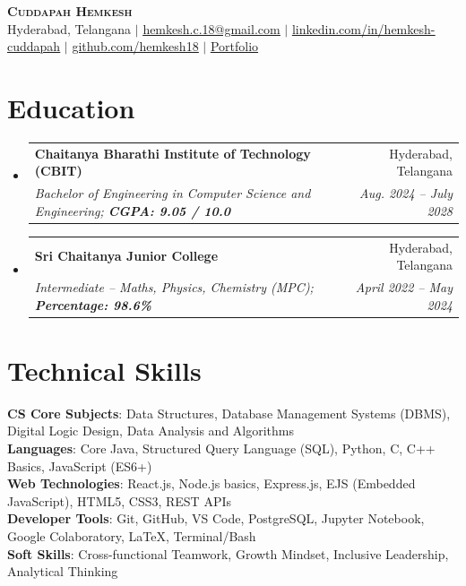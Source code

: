 \documentclass[letterpaper,10.8pt]{article}
\makeatletter
\newcommand{\resumeSubheading}[4]{
  \vspace{-2pt}\item
    \begin{tabular*}{0.97\textwidth}[t]{l@{\extracolsep{\fill}}r}
      \textbf{#1} & #2 \\
      \textit{\small#3} & \textit{\small #4} \\
    \end{tabular*}\vspace{-6pt}
}
\newcommand{\resumeSubHeadingListStart}{\begin{itemize}[leftmargin=0.15in, label={}]}
\newcommand{\resumeSubHeadingListEnd}{\end{itemize}}
\makeatother
\begin{document}
\begin{center}
    \textbf{\Huge \scshape Cuddapah Hemkesh} \\ \vspace{4pt}
    \small Hyderabad, Telangana $|$ 
    \href{mailto:hemkesh.c.18@gmail.com}{\underline{hemkesh.c.18@gmail.com}} $|$ 
    \href{https://linkedin.com/in/hemkesh-cuddapah}{\underline{linkedin.com/in/hemkesh-cuddapah}} $|$ 
    \href{https://github.com/hemkesh18}{\underline{github.com/hemkesh18}} $|$ 
    \href{https://hemkesh-portfolio.vercel.app}{\underline{Portfolio}}
\end{center}

\section{Education}
  \resumeSubHeadingListStart
    \resumeSubheading
      {Chaitanya Bharathi Institute of Technology (CBIT)}{Hyderabad, Telangana}
      {Bachelor of Engineering in Computer Science and Engineering; \textbf{CGPA: 9.05 / 10.0}}{Aug. 2024 -- July 2028}
    \resumeSubheading
      {Sri Chaitanya Junior College}{Hyderabad, Telangana}
      {Intermediate -- Maths, Physics, Chemistry (MPC); \textbf{Percentage: 98.6\%}}{April 2022 -- May 2024}
  \resumeSubHeadingListEnd

\section{Technical Skills}
 \begin{itemize}[leftmargin=0.15in, label={}]
    \small{\item{
     \textbf{CS Core Subjects}{: Data Structures, Database Management Systems (DBMS), Digital Logic Design, Data Analysis and Algorithms} \\
     \textbf{Languages}{: Core Java, Structured Query Language (SQL), Python, C, C++ Basics, JavaScript (ES6+)} \\
     \textbf{Web Technologies}{: React.js, Node.js basics, Express.js, EJS (Embedded JavaScript), HTML5, CSS3, REST APIs} \\
     \textbf{Developer Tools}{: Git, GitHub, VS Code, PostgreSQL, Jupyter Notebook, Google Colaboratory, LaTeX, Terminal/Bash} \\
     \textbf{Soft Skills}{: Cross-functional Teamwork, Growth Mindset, Inclusive Leadership, Analytical Thinking}
    }}
 \end{itemize}
 \vspace{-12pt}
\end{document}
